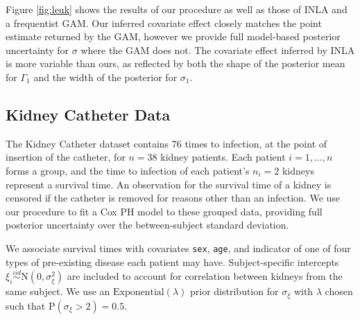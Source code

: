 \documentclass[num-refs,serif,10pt]{wiley-article}
\begin{document}
Figure \ref{fig:leuk} shows the results of our procedure as well as those of INLA and a frequentist GAM. Our inferred covariate effect closely matches the point estimate returned by the GAM, however we provide full model-based posterior uncertainty for $\sigma$ where the GAM does not. The covariate effect inferred by INLA is more variable than ours, as reflected by both the shape of the posterior mean for $\Gamma_{1}$ and the width of the posterior for $\sigma_{1}$.

\subsection{Kidney Catheter Data}\label{subsec:kidney}

The Kidney Catheter dataset contains 76 times to infection, at the point of insertion of the catheter, for $n = 38$  kidney patients. Each patient $i=1,\ldots,n$ forms a group, and the time to infection of each patient's $n_{i} = 2$ kidneys represent a survival time. An observation for the survival time of a kidney is censored if the catheter is removed for reasons other than an infection. We use our procedure to fit a Cox PH model to these grouped data, providing full posterior uncertainty over the between-subject standard deviation.

We associate survival times with covariates \texttt{sex}, \texttt{age}, and indicator of one of four types of pre-existing disease each patient may have. Subject-specific intercepts $\xi_{i}\overset{iid}{\sim}\text{N}(0,\sigma^{2}_{\xi})$ are included to account for correlation between kidneys from the same subject. We use an $\text{Exponential}(\lambda)$ prior distribution for $\sigma_{\xi}$ with $\lambda$ chosen such that $\text{P}(\sigma_{\xi} > 2) = 0.5$.

\begin{table}[ht]
\centering
{}
\caption{Estimated means and standard deviations of linear effects by proposed method, Coxph and INLA, for Example \ref{subsec:kidney}.}
\label{table:KidneyFixed}
\end{table}
\end{document}
